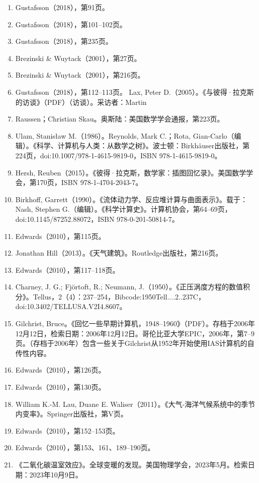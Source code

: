 \begin{enumerate}
\item Gustafsson（2018），第91页。  
\item Gustafsson（2018），第101–102页。  
\item Gustafsson（2018），第235页。  
\item Brezinski & Wuytack（2001），第27页。  
\item Brezinski & Wuytack（2001），第216页。  
\item Gustafsson（2018），第112–113页。  
Lax, Peter D.（2005）。《与彼得·拉克斯的访谈》（PDF）（访谈）。采访者：Martin \item Raussen；Christian Skau。奥斯陆：美国数学学会通报，第223页。  
\item Ulam, Stanisław M.（1986）。Reynolds, Mark C.；Rota, Gian-Carlo（编辑）。《科学、计算机与人类：从数学之树》。波士顿：Birkhäuser出版社，第224页，doi:10.1007/978-1-4615-9819-0，ISBN 978-1-4615-9819-0。  
\item Hersh, Reuben（2015）。《彼得·拉克斯，数学家：插图回忆录》。美国数学学会，第170页，ISBN 978-1-4704-2043-7。  
\item Birkhoff, Garrett（1990）。《流体动力学、反应堆计算与曲面表示》。载于：Nash, Stephen G.（编辑）。《科学计算史》。计算机协会，第64–69页，doi:10.1145/87252.88072，ISBN 978-0-201-50814-7。  
\item Edwards（2010），第115页。  
\item Jonathan Hill（2013）。《天气建筑》。Routledge出版社，第216页。
\item Edwards（2010），第117–118页。  
\item Charney, J. G.; Fjörtoft, R.; Neumann, J.（1950）。《正压涡度方程的数值积分》。Tellus，2（4）：237–254，Bibcode:1950Tell....2..237C，doi:10.3402/TELLUSA.V2I4.8607。  
\item Gilchrist, Bruce。《回忆一些早期计算机，1948–1960》（PDF）。存档于2006年12月12日，检索日期：2006年12月12日。哥伦比亚大学EPIC，2006年，第7–9页。（存档于2006年）包含一些关于Gilchrist从1952年开始使用IAS计算机的自传性内容。  
\item Edwards（2010），第126页。  
\item Edwards（2010），第130页。  
\item William K.-M. Lau, Duane E. Waliser（2011）。《大气-海洋气候系统中的季节内变率》。Springer出版社，第V页。  
\item Edwards（2010），第152–153页。  
\item Edwards（2010），第153、161、189–190页。  
\item 《二氧化碳温室效应》。全球变暖的发现。美国物理学会，2023年5月。检索日期：2023年10月9日。  

\end{enumerate}

